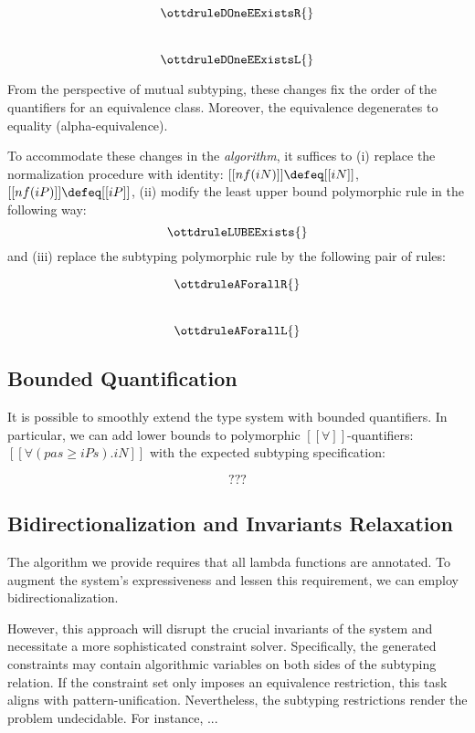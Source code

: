 \begin{multicols}{2}
$$ \ottdruleDOneEExistsR{} $$\\
$$ \ottdruleDOneEExistsL{} $$
\end{multicols}
\vspace{\baselineskip}
From the perspective of mutual subtyping,
these changes fix the order of the quantifiers for an equivalence class. 
Moreover, the equivalence degenerates to equality (alpha-equivalence). 

To accommodate these changes in the \emph{algorithm}, 
it suffices to 
    (i) replace the normalization procedure with identity: $[[nf(iN)]] \defeq [[iN]]$, $[[nf(iP)]] \defeq [[iP]]$,
    (ii) modify the least upper bound polymorphic rule  in the following way:
        $$\ottdruleLUBEExists{}$$ 
    and 
    (iii) replace the subtyping polymorphic rule  
    by the following pair of rules:
    \begin{multicols}{2}
            $$\ottdruleAForallR{}$$\\
            $$\ottdruleAForallL{}$$
    \end{multicols}

\subsection{Bounded Quantification}

It is possible to smoothly extend the type system with bounded quantifiers.
In particular, we can add lower bounds to polymorphic $[[∀]]$-quantifiers:
$[[∀(pas ≥ iPs). iN]]$ with the expected subtyping specification: 

$$ ??? $$


\subsection{Bidirectionalization and Invariants Relaxation}

The algorithm we provide requires that all lambda functions are annotated. To
augment the system's expressiveness and lessen this requirement, we can employ
bidirectionalization.

However, this approach will disrupt the crucial invariants of the system and
necessitate a more sophisticated constraint solver. Specifically, the generated
constraints may contain algorithmic variables on both sides of the subtyping
relation. If the constraint set only imposes an equivalence restriction, this
task aligns with pattern-unification. Nevertheless, the subtyping restrictions
render the problem undecidable. For instance, ...
